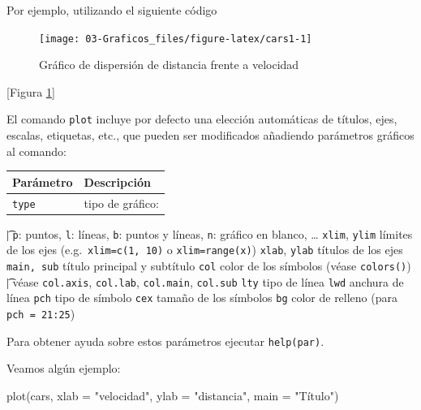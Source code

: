 \documentclass[
]{book}
\newenvironment{Shaded}{\begin{snugshade}}{\end{snugshade}}
\newcommand{\AttributeTok}[1]{\textcolor[rgb]{0.77,0.63,0.00}{#1}}
\newcommand{\CommentTok}[1]{\textcolor[rgb]{0.56,0.35,0.01}{\textit{#1}}}
\newcommand{\FunctionTok}[1]{\textcolor[rgb]{0.00,0.00,0.00}{#1}}
\newcommand{\NormalTok}[1]{#1}
\newcommand{\SpecialCharTok}[1]{\textcolor[rgb]{0.00,0.00,0.00}{#1}}
\newcommand{\StringTok}[1]{\textcolor[rgb]{0.31,0.60,0.02}{#1}}
\theoremstyle{break}
\begin{document}
Por ejemplo, utilizando el siguiente código

\begin{Shaded}
\end{Shaded}

\begin{figure}[!htb]

{\centering \texttt{[image: 03-Graficos\_files/figure-latex/cars1-1]} 

}

\caption{Gráfico de dispersión de distancia frente a velocidad}\label{fig:cars1}
\end{figure}

{[}Figura \ref{fig:cars1}{]}

El comando \texttt{plot} incluye por defecto una elección automáticas de
títulos, ejes, escalas, etiquetas, etc., que pueden ser modificados
añadiendo parámetros gráficos al comando:

\begin{longtable}[]{@{}ll@{}}
\toprule
Parámetro & Descripción \\
\midrule
\endhead
\texttt{type} & tipo de gráfico: \\
\bottomrule
\end{longtable}

\t      | \texttt{p}: puntos, \texttt{l}: líneas, \texttt{b}: puntos y líneas, \texttt{n}: gráfico en blanco, \ldots{}
\texttt{xlim}, \texttt{ylim} \textbar{} límites de los ejes (e.g.~\texttt{xlim=c(1,\ 10)} o \texttt{xlim=range(x)})
\texttt{xlab}, \texttt{ylab} \textbar{} títulos de los ejes
\texttt{main,\ sub} \textbar{} título principal y subtítulo
\texttt{col} \textbar{} color de los símbolos (véase \texttt{colors()})
\t     | véase \texttt{col.axis}, \texttt{col.lab}, \texttt{col.main}, \texttt{col.sub}
\texttt{lty} \textbar{} tipo de línea
\texttt{lwd} \textbar{} anchura de línea
\texttt{pch} \textbar{} tipo de símbolo
\texttt{cex} \textbar{} tamaño de los símbolos
\texttt{bg} \textbar{} color de relleno (para \texttt{pch\ =\ 21:25})

Para obtener ayuda sobre estos parámetros ejecutar \texttt{help(par)}.

Veamos algún ejemplo:

\begin{Shaded}
\begin{Highlighting}[]
\FunctionTok{plot}\NormalTok{(cars, }\AttributeTok{xlab =} \StringTok{"velocidad"}\NormalTok{, }\AttributeTok{ylab =} \StringTok{"distancia"}\NormalTok{, }\AttributeTok{main =} \StringTok{"Título"}\NormalTok{)}
\end{Highlighting}
\end{Shaded}
\end{document}
